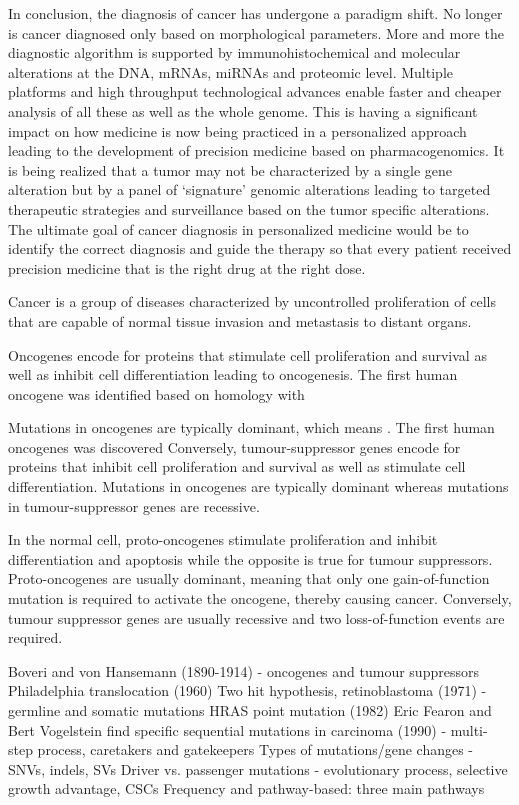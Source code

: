 In conclusion, the diagnosis of cancer has undergone a paradigm shift. No longer is cancer diagnosed only based on morphological parameters. More and more the diagnostic algorithm is supported by immunohistochemical and molecular alterations at the DNA, mRNAs, miRNAs and proteomic level. Multiple platforms and high throughput technological advances enable faster and cheaper analysis of all these as well as the whole genome. This is having a significant impact on how medicine is now being practiced in a personalized approach leading to the development of precision medicine based on pharmacogenomics. It is being realized that a tumor may not be characterized by a single gene alteration but by a panel of ‘signature’ genomic alterations leading to targeted therapeutic strategies and surveillance based on the tumor specific alterations. The ultimate goal of cancer diagnosis in personalized medicine would be to identify the correct diagnosis and guide the therapy so that every patient received precision medicine that is the right drug at the right dose.

Cancer is a group of diseases characterized by uncontrolled proliferation of cells that are capable of normal tissue invasion and metastasis to distant organs.

Oncogenes encode for proteins that stimulate cell proliferation and survival as well as inhibit cell differentiation leading to oncogenesis. The first human oncogene was identified based on homology with

Mutations in oncogenes are typically dominant, which means . The first human oncogenes was discovered Conversely, tumour-suppressor genes encode for proteins that inhibit cell proliferation and survival as well as stimulate cell differentiation. Mutations in oncogenes are typically dominant whereas mutations in tumour-suppressor genes are recessive.

In the normal cell, proto-oncogenes stimulate proliferation and inhibit differentiation and apoptosis while the opposite is true for tumour suppressors. Proto-oncogenes are usually dominant, meaning that only one gain-of-function mutation is required to activate the oncogene, thereby causing cancer. Conversely, tumour suppressor genes are usually recessive and two loss-of-function events are required.

Boveri and von Hansemann (1890-1914) - oncogenes and tumour suppressors
Philadelphia translocation (1960)
Two hit hypothesis, retinoblastoma (1971) - germline and somatic mutations
HRAS point mutation (1982)
Eric Fearon and Bert Vogelstein find specific sequential mutations in carcinoma (1990) - multi-step process, caretakers and gatekeepers
Types of mutations/gene changes - SNVs, indels, SVs
Driver vs. passenger mutations - evolutionary process, selective growth advantage, CSCs
Frequency and pathway-based: three main pathways

